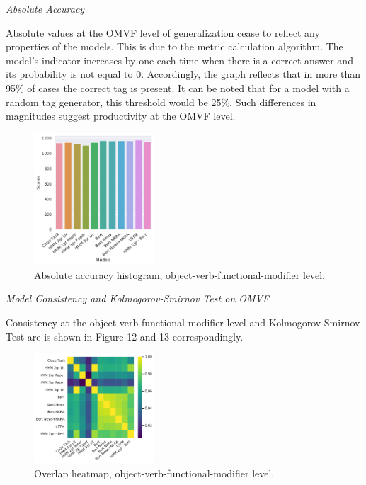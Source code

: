 \documentclass[a4paper]{article}
\newcommand{\head}[1]{\vspace{0.5em}\emph{#1}\vspace{0.25em}}
\begin{document}
\head{Absolute Accuracy}

Absolute values at the OMVF level of generalization cease to reflect
any properties of the models. This is due to the metric calculation
algorithm. The model's indicator increases by one each time when there
is a correct answer and its probability is not equal to 0.
Accordingly, the graph reflects that in more than 95\% of cases the
correct tag is present. It can be noted that for a model with a random
tag generator, this threshold would be 25\%. Such differences in magnitudes suggest productivity at the OMVF level. 

\begin{figure}
\caption{Absolute accuracy histogram, object-verb-functional-modifier level.}
\label{fig:abs-accuracy-hist-ovfm}
\centering
\includegraphics[width=0.4\textwidth]{figures/pdf/abs-accuracy-hist-ovfm.pdf}
\end{figure}

\head{Model Consistency and Kolmogorov-Smirnov Test on OMVF}

Consistency at the object-verb-functional-modifier level  and Kolmogorov-Smirnov Test are is shown in Figure 12 and 13 correspondingly.

\begin{figure}
\label{fig:heatmap-context-accord-ovfm}
\caption{Overlap heatmap, object-verb-functional-modifier level.}
\centering
\includegraphics[width=0.4\textwidth]{figures/pdf/heatmap-context-accord-ovfm.pdf}
\end{figure}
\end{document}
